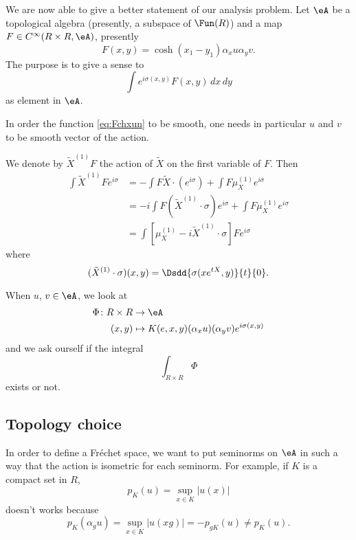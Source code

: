 We are now able to give a better statement of our analysis problem. Let $\eA$ be a topological algebra (presently, a subspace of $\Fun(R)$) and a map $F\in C^{\infty}(R\times R,\eA)$, presently
\begin{equation} \label{eq:Fchxun}
	F(x,y)=\cosh(x_1-y_1)\alpha_x u\alpha_yv.
\end{equation}
The purpose is to give a sense to
\begin{equation}
	\int e^{i\sigma(x,y)}F(x,y)\,dx\,dy
\end{equation}
as element in $\eA$.

\begin{remark}
	In order the function \eqref{eq:Fchxun} to be smooth, one needs in particular $u$ and $v$ to be smooth vector of the action.
\end{remark}

We denote by $\tilde X^{(1)}F$ the action of $\tilde X$ on the first variable of $F$. Then
\begin{equation}
	\begin{split}
		\int \tilde X^{(1)}F e^{i\sigma}&=-\int F\tilde X\cdot(e^{i\sigma})+\int F\mu^{(1)}_Xe^{i\sigma}\\
		&=-i\int F(\tilde X^{(1)}\cdot \sigma)e^{i\sigma}+\int F\mu_X^{(1)}e^{i\sigma}\\
		&=\int [\mu_X^{(1)}-i\tilde X^{(1)}\cdot \sigma]Fe^{i\sigma}
	\end{split}
\end{equation}
where
\begin{equation}
	(\tilde X^{(1)}\cdot \sigma)(x,y)=\Dsdd{ \sigma(xe^{tX},y) }{t}{0}.
\end{equation}

When $u$, $v\in\eA$, we look at
\begin{equation}
	\begin{aligned}
		\Phi \colon R\times R & \to \eA                                                \\
		(x,y)                 & \mapsto K(e,x,y)(\alpha_xu)(\alpha_yv)e^{i\sigma(x,y)}
	\end{aligned}
\end{equation}
and we ask ourself if the integral
\[
	\int_{R\times R}\Phi
\]
exists or not.

\subsection{Topology choice}

In order to define a Fréchet space, we want to put seminorms on $\eA$ in such a way that the action is isometric for each seminorm. For example, if $K$ is a compact set in $R$,
\[
	p_K(u)=\sup_{x\in K}| u(x) |
\]
doesn't works because
\[
	p_K(\alpha_gu)=\sup_{x\in K}| u(xg) | =-p_{gK}(u)\neq p_K(u).
\]


